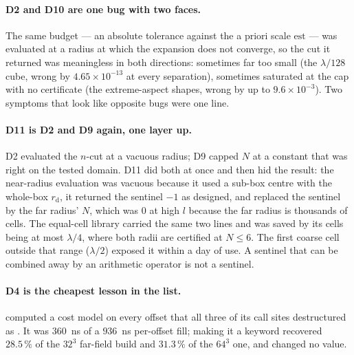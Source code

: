 \paragraph{D2 and D10 are one bug with two faces.} The same budget --- an absolute tolerance
against the a priori scale $\mathrm{est}$ --- was evaluated at a radius at which the
expansion does not converge, so the cut it returned was meaningless in both directions:
sometimes far too small (the $\lambda/128$ cube, wrong by $4.65\times10^{-13}$ at every
separation), sometimes saturated at the cap with no certificate (the extreme-aspect shapes,
wrong by up to $9.6\times10^{-3}$). Two symptoms that look like opposite bugs were one line.

\paragraph{D11 is D2 and D9 again, one layer up.} D2 evaluated the $n$-cut at a vacuous
radius; D9 capped $N$ at a constant that was right on the tested domain. D11 did both at
once and then hid the result: the near-radius evaluation was vacuous because it used a
sub-box centre with the whole-box $r_{\mathrm{d}}$, it returned the sentinel $-1$ as
designed, and  replaced the sentinel by the far radius' $N$, which was $0$ at
high $l$ because the far radius is thousands of cells. The equal-cell library carried the
same two lines and was saved by its cells being at most $\lambda/4$, where both radii are
certified at $N\le6$. The first coarse cell outside that range ($\lambda/2$) exposed it
within a day of use. A sentinel that can be combined away by an arithmetic operator is not
a sentinel.

\paragraph{D4 is the cheapest lesson in the list.}  computed a cost model on
every offset that all three of its call sites destructured as \code{\_}. It was $360$~ns of a
$936$~ns per-offset fill; making it a keyword recovered $28.5\,\%$ of the $32^3$ far-field
build and $31.3\,\%$ of the $64^3$ one, and changed no value.
